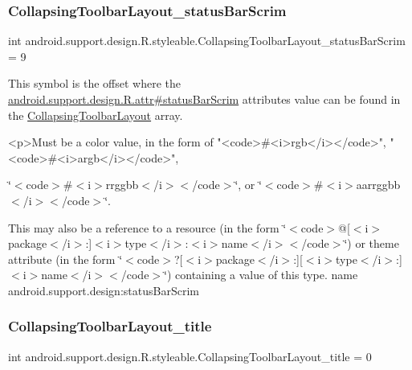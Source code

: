 \subsubsection{\texorpdfstring{Collapsing\+Toolbar\+Layout\+\_\+status\+Bar\+Scrim}{CollapsingToolbarLayout\_statusBarScrim}}
{\footnotesize\ttfamily int android.\+support.\+design.\+R.\+styleable.\+Collapsing\+Toolbar\+Layout\+\_\+status\+Bar\+Scrim = 9\hspace{0.3cm}{\ttfamily [static]}}

This symbol is the offset where the \hyperlink{classandroid_1_1support_1_1design_1_1R_1_1attr_a676b0bc448d5a54602f309542f409713}{android.\+support.\+design.\+R.\+attr\#status\+Bar\+Scrim} attribute\textquotesingle{}s value can be found in the \hyperlink{classandroid_1_1support_1_1design_1_1R_1_1styleable_a4a019838b1c3daad84b4ffff397db335}{Collapsing\+Toolbar\+Layout} array.

\begin{DoxyVerb}      <p>Must be a color value, in the form of "<code>#<i>rgb</i></code>", "<code>#<i>argb</i></code>",
\end{DoxyVerb}
 \char`\"{}$<$code$>$\#$<$i$>$rrggbb$<$/i$>$$<$/code$>$\char`\"{}, or \char`\"{}$<$code$>$\#$<$i$>$aarrggbb$<$/i$>$$<$/code$>$\char`\"{}. 

This may also be a reference to a resource (in the form \char`\"{}$<$code$>$@\mbox{[}$<$i$>$package$<$/i$>$\+:\mbox{]}$<$i$>$type$<$/i$>$\+:$<$i$>$name$<$/i$>$$<$/code$>$\char`\"{}) or theme attribute (in the form \char`\"{}$<$code$>$?\mbox{[}$<$i$>$package$<$/i$>$\+:\mbox{]}\mbox{[}$<$i$>$type$<$/i$>$\+:\mbox{]}$<$i$>$name$<$/i$>$$<$/code$>$\char`\"{}) containing a value of this type.  name android.\+support.\+design\+:status\+Bar\+Scrim \mbox{\label{classandroid_1_1support_1_1design_1_1R_1_1styleable_aed337c7cc5f2d54034841fd6d7dfda1d}} 
\subsubsection{\texorpdfstring{Collapsing\+Toolbar\+Layout\+\_\+title}{CollapsingToolbarLayout\_title}}
{\footnotesize\ttfamily int android.\+support.\+design.\+R.\+styleable.\+Collapsing\+Toolbar\+Layout\+\_\+title = 0\hspace{0.3cm}{\ttfamily [static]}}

